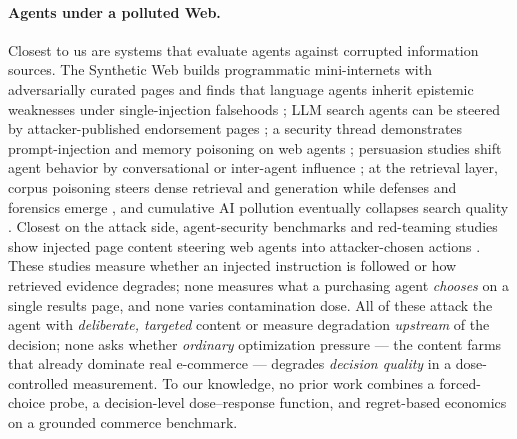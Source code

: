 \paragraph{Agents under a polluted Web.}
Closest to us are systems that evaluate agents against corrupted information sources. The Synthetic Web builds programmatic mini-internets with adversarially curated pages and finds that language agents inherit epistemic weaknesses under single-injection falsehoods \cite{shah2026synthetic}; LLM search agents can be steered by attacker-published endorsement pages \cite{chen2026much}; a security thread demonstrates prompt-injection and memory poisoning on web agents \cite{cao2026ward,yang2026zombie,syros2026muzzle,wang2025webinject,li2025security}; persuasion studies shift agent behavior by conversational or inter-agent influence \cite{jeong2026persuasion,zhou2026epistemic}; at the retrieval layer, corpus poisoning steers dense retrieval and generation while defenses and forensics emerge \cite{li2025unsupervised,chen2025uncovering,zhang2025traceback,zhang2025benchmarking,cheng2025secure}, and cumulative AI pollution eventually collapses search quality \cite{yu2026retrieval}. Closest on the attack side, agent-security benchmarks and red-teaming studies show injected page content steering web agents into attacker-chosen actions \cite{evtimov2025wasp,liu2026pina,yan2026searchattack}. These studies measure whether an injected instruction is followed or how retrieved evidence degrades; none measures what a purchasing agent \emph{chooses} on a single results page, and none varies contamination dose. All of these attack the agent with \emph{deliberate, targeted} content or measure degradation \emph{upstream} of the decision; none asks whether \emph{ordinary} optimization pressure --- the content farms that already dominate real e-commerce --- degrades \emph{decision quality} in a dose-controlled measurement. To our knowledge, no prior work combines a forced-choice probe, a decision-level dose--response function, and regret-based economics on a grounded commerce benchmark.
